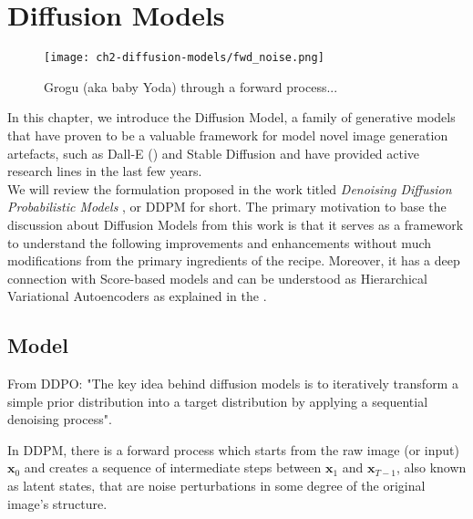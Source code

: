 \chapter{Diffusion Models}


\begin{figure}[ht]
    \centering
    \texttt{[image: ch2-diffusion-models/fwd\_noise.png]}
    \captionsetup{width=\textwidth} %
    \caption{Grogu (aka baby Yoda) through a forward process...}
    \label{fig:fwd-process-grogu}
\end{figure}
  
In this chapter, we introduce the Diffusion Model, a family of generative models that have proven to be a valuable framework for model novel image generation artefacts, such as Dall-E () and Stable Diffusion and have provided active research lines in the last few years.\\

We will review the formulation proposed in the work titled \textit{Denoising Diffusion Probabilistic Models} \cite{ho2020denoising}, or DDPM for short. The primary motivation to base the discussion about Diffusion Models from this work is that it serves as a framework to understand the following improvements and enhancements without much modifications from the primary ingredients of the recipe. Moreover, it has a deep connection with Score-based models \cite{song2020denoising} and can be understood as Hierarchical Variational Autoencoders as explained in the \cite{luo2022understanding}.\\

\section{Model}

From DDPO: "The key idea behind diffusion models is to iteratively transform a simple prior distribution into a target distribution by applying a sequential denoising process".

In DDPM, there is a forward process which starts from the raw image (or input) $\mathbf{x}_{0}$ and creates a sequence
of intermediate steps between $\mathbf{x}_{1}$ and $\mathbf{x}_{T-1}$, also known as latent states, that are noise perturbations in some degree of the original image's structure.\\ 

